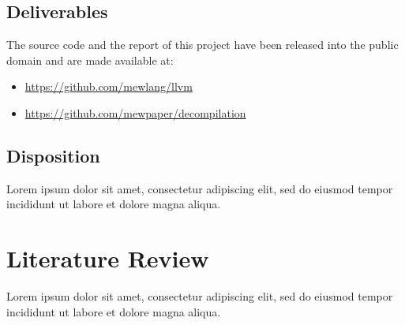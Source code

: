 \documentclass[12pt, a4paper]{article}
\begin{document}

\subsection{Deliverables}

The source code and the report of this project have been released into the public domain \cite{cc0} and are made available at:
\begin{itemize}
	\item \url{https://github.com/mewlang/llvm}
	\item \url{https://github.com/mewpaper/decompilation}
\end{itemize}

%
%


\subsection{Disposition}

Lorem ipsum dolor sit amet, consectetur adipiscing elit, sed do eiusmod tempor incididunt ut labore et dolore magna aliqua.



\section{Literature Review}

Lorem ipsum dolor sit amet, consectetur adipiscing elit, sed do eiusmod tempor incididunt ut labore et dolore magna aliqua.
\end{document}
